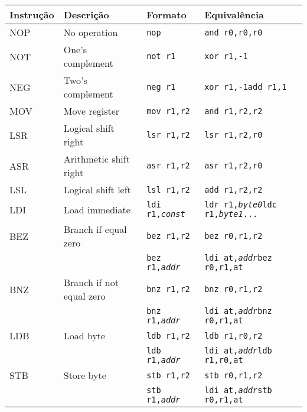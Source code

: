 \documentclass{extreport}
\begin{document}
\begin{table}[ht!]
\centering
\begin{tabular}{|p{2.0cm}|p{4.0cm}|p{3.5cm}|p{3.5cm}|}
\hline
\bf{Instrução} 				& \bf{Descrição} & \bf{Formato} & \bf{Equivalência} \\ \hline \hline
NOP  & No operation 			& \texttt{nop} & \texttt{and r0,r0,r0}  \\ \hline
NOT  & One's complement 		& \texttt{not r1} & \texttt{xor r1,-1}  \\ \hline
NEG  & Two's complement			& \texttt{neg r1} & \texttt{xor r1,-1\newline add r1,1} \\ \hline
MOV  & Move register			& \texttt{mov r1,r2} & \texttt{and r1,r2,r2} \\ \hline
LSR  & Logical shift right		& \texttt{lsr r1,r2} & \texttt{lsr r1,r2,r0} \\ \hline
ASR  & Arithmetic shift right		& \texttt{asr r1,r2} & \texttt{asr r1,r2,r0} \\ \hline
LSL  & Logical shift left		& \texttt{lsl r1,r2} & \texttt{add r1,r2,r2} \\ \hline
LDI  & Load immediate			& \texttt{ldi r1,\textit{const}} & \texttt{ldr r1,\textit{byte0}\newline ldc r1,\textit{byte1}\newline ...} \\ \hline
BEZ  & Branch if equal zero		& \texttt{bez r1,r2} & \texttt{bez r0,r1,r2} \\ \hline
	& 				& \texttt{bez r1,\textit{addr}} & \texttt{ldi at,\textit{addr}\newline bez r0,r1,at} \\ \hline
BNZ  & Branch if not equal zero		& \texttt{bnz r1,r2} & \texttt{bnz r0,r1,r2} \\ \hline
	& 				& \texttt{bnz r1,\textit{addr}} & \texttt{ldi at,\textit{addr}\newline bnz r0,r1,at} \\ \hline
LDB  & Load byte			& \texttt{ldb r1,r2} & \texttt{ldb r1,r0,r2} \\ \hline
	& 				& \texttt{ldb r1,\textit{addr}} & \texttt{ldi at,\textit{addr}\newline ldb r1,r0,at} \\ \hline
STB  & Store byte			& \texttt{stb r1,r2} & \texttt{stb r0,r1,r2} \\ \hline
	& 				& \texttt{stb r1,\textit{addr}} & \texttt{ldi at,\textit{addr}\newline stb r0,r1,at} \\ \hline

\end{tabular}
\end{table}
\end{document}
